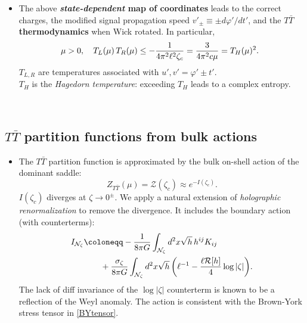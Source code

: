 \documentclass[10pt]{article}
\newcommand{\citations}[1]{{\footnotesize#1\par}}
\newcommand{\TTbar}{\texorpdfstring{\ensuremath{T\bar{T}}}{TTbar}\xspace}
\begin{document}
\begin{multicols}{3}
\begin{itemize}
\item The above \textbf{\textit{state-dependent} map of \mbox{coordinates}} leads to the correct charges, the modified signal propagation speed $v'_{\pm} \equiv \pm {d\varphi'}/{dt'}$, and the \TTbar \textbf{thermodynamics} when Wick rotated. In particular,
	\begin{equation*}
	\hspace{-.5em} \mu > 0,\quad
		T_L(\mu)\,T_R(\mu) \le - \frac{1}{4\pi^2 \ell^2 \zeta_c} = \frac{3}{4\pi^2c\mu} = T_H(\mu)^2.
	\end{equation*}
	$T_{L,R}$ are temperatures associated with $u',v' = \varphi' \pm t'$.\\
	$T_H$ is the \textit{Hagedorn temperature}: exceeding $T_H$ leads to a complex entropy.

\begin{flushright}
\vspace{-.5\baselineskip}
\citations{
\textcite{Giveon:2017nie}\\
\textcite{Apolo:2019zai}
}
\vspace{-\baselineskip}
\end{flushright}

\end{itemize}

\subsection*{\TTbar partition functions from bulk actions} \label{se:partitionfunction}

\begin{itemize}
\item The \TTbar partition function is approximated by the bulk on-shell action of the dominant saddle:
	\begin{equation}
		Z_{T\bar T} (\mu) = \mathcal Z (\zeta_c) \approx  e^{-I(\zeta_c)}. \label{partition2}
	\end{equation}
$I(\zeta_c)$ \mbox{diverges} at $\zeta \to 0^\pm$. We apply a natural extension of \textit{holographic renormalization} to remove the divergence.
It includes the boundary action (with counterterms):
	\begin{align}
		I_{\mathcal N_{\zeta}} & \coloneqq  - \frac{1}{8\pi G} \int_{\mathcal N_{\zeta}} d^2x \sqrt{h}\,h^{ij} K_{ij} \notag
	\\& \qquad + \frac{\sigma_\zeta}{8\pi G} \int_{\mathcal N_{\zeta}} d^2x \sqrt{h} \, \bigg(\ell^{-1} - \frac{\ell  \mathcal{R}[h]}{4} \log |\zeta| \bigg). \label{boundaryaction}
	\end{align}
	The lack of diff invariance of the $\log |\zeta|$ counterterm is known to be a reflection of the Weyl anomaly. 
	The \mbox{action} is consistent with the Brown-York stress \mbox{tensor} in \eqref{BYtensor}. 


\end{itemize}
\end{multicols}
\end{document}

